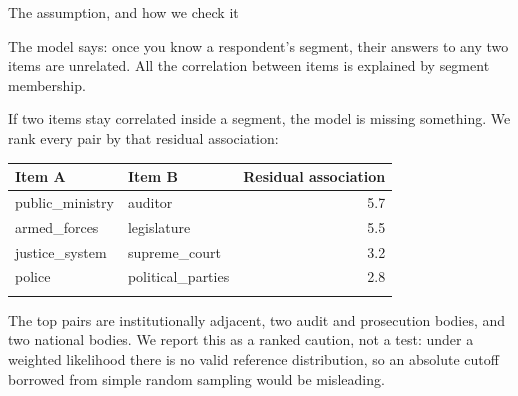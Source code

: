 \documentclass[
  ignorenonframetext,
  aspectratio=169,
]{beamer}
\newcommand{\kicker}[1]{\par\noindent{\footnotesize\color{vteal}\textbf{\MakeUppercase{#1}}}\par\vspace{0.4em}}
\begin{document}
\begin{frame}[shrink]{The assumption, and how we check it}
\label{the-assumption-and-how-we-check-it}
\kicker{local independence}

\small

The model says: once you know a respondent's segment, their answers to
any two items are unrelated. All the correlation between items is
explained by segment membership.

\vspace{0.5em}

If two items stay correlated inside a segment, the model is missing
something. We rank every pair by that residual association:

\label{tbl-bvr}
\begin{longtable}[]{@{}llr@{}}
\toprule\noalign{}
Item A & Item B & Residual association \\
\midrule\noalign{}
\endhead
public\_ministry & auditor & 5.7 \\
armed\_forces & legislature & 5.5 \\
justice\_system & supreme\_court & 3.2 \\
police & political\_parties & 2.8 \\
\bottomrule\noalign{}
\end{longtable}

\footnotesize

The top pairs are institutionally adjacent, two audit and prosecution
bodies, and two national bodies. We report this as a ranked caution, not
a test: under a weighted likelihood there is no valid reference
distribution, so an absolute cutoff borrowed from simple random sampling
would be misleading.

\end{frame}
\end{document}
